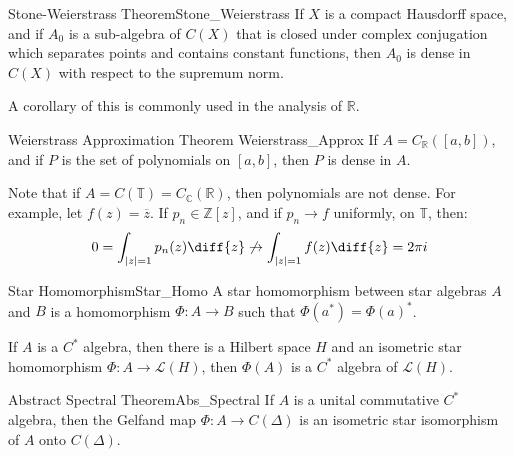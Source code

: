     \begin{ltheorem}{Stone-Weierstrass Theorem}{Stone_Weierstrass}
        If $X$ is a compact Hausdorff space, and if $A_{0}$ is
        a sub-algebra of $C(X)$ that is closed under complex
        conjugation which separates points and contains constant
        functions, then $A_{0}$ is dense in $C(X)$ with respect
        to the supremum norm.
    \end{ltheorem}
    A corollary of this is commonly used in the analysis of
    $\mathbb{R}$.
    \begin{ltheorem}{Weierstrass Approximation Theorem}
          {Weierstrass_Approx}
        If $A=C_{\mathbb{R}}([a,b])$, and if
        $P$ is the set of polynomials on $[a,b]$, then
        $P$ is dense in $A$.
    \end{ltheorem}
    Note that if $A=C(\mathbb{T})=C_{\mathbb{C}}(\mathbb{R})$,
    then polynomials are not dense. For example, let
    $f(z)=\overline{z}$. If $p_{n}\in\mathbb{Z}[z]$, and if
    $p_{n}\rightarrow{f}$ uniformly, on $\mathbb{T}$, then:
    \begin{equation}
        0=\int_{|z|=1}p_{n}(z)\diff{z}\not\rightarrow
        \int_{|z|=1}f(z)\diff{z}=2\pi{i}
    \end{equation}
    \begin{ldefinition}{Star Homomorphism}{Star_Homo}
        A star homomorphism between star algebras $A$ and $B$
        is a homomorphism $\Phi:A\rightarrow{B}$ such that
        $\Phi(a^{*})=\Phi(a)^{*}$.
    \end{ldefinition}
    \begin{theorem}
        If $A$ is a $C^{*}$ algebra, then there is a Hilbert
        space $H$ and an isometric star homomorphism
        $\Phi:A\rightarrow\mathscr{L}(H)$, then $\Phi(A)$ is a
        $C^{*}$ algebra of $\mathscr{L}(H)$.
    \end{theorem}
    \begin{ltheorem}{Abstract Spectral Theorem}{Abs_Spectral}
        If $A$ is a unital commutative $C^{*}$ algebra, then
        the Gelfand map $\Phi:A\rightarrow{C}(\Delta)$ is an
        isometric star isomorphism of $A$ onto $C(\Delta)$.
    \end{ltheorem}
